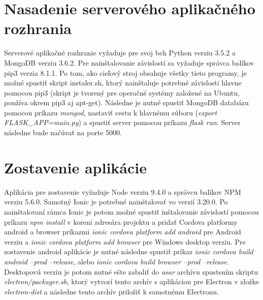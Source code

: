 \section{Nasadenie serverového aplikačného rozhrania}
Serverové aplikačné rozhranie vyžaduje pre svoj beh Python verziu 3.5.2 a MongoDB verziu 3.6.2. Pre nainštalovanie závislostí sa vyžaduje správca balíkov pip3 verzia 8.1.1. Po tom, ako cieľový stroj obsahuje všetky tieto programy, je možné spustiť skript instaler.sh, ktorý nainštaluje potrebné závislosti hlavne pomocou pip3 (skript je tvorený pre operačné systémy založené na Ubuntu, používa okrem pip3 aj apt-get). Následne je nutné spustiť MongoDB databázu pomocou príkazu \textit{mongod}, nastaviť cestu k hlavnému súboru (\textit{export FLASK\_APP=main.py}) a spustiť server pomocou príkazu \textit{flask run}. Server následne bude načúvať na porte 5000. 

\section{Zostavenie aplikácie}
Aplikácia pre zostavenie vyžaduje Node verziu 9.4.0 a správcu balíkov NPM verziu 5.6.0. Samotný Ionic je potrebné nainštalovať vo verzií 3.20.0. Po nainštalovaní rámca Ionic je potom možné spustiť inštalovanie závislostí pomocou príkazu \textit{npm install} v koreni adresára projektu a pridať Cordova platformy android a browser príkazmi \textit{ionic cordova platform add android} pre Android verziu a \textit{ionic cordova platform add browser} pre Windows desktop verziu. Pre zostavenie android aplikácie je nutné následne spustiť príkaz \textit{ionic cordova build android --prod --release}, alebo \textit{ionic cordova build browser --prod --release}. Desktopovú verziu je potom nutné ešte zabaliť do \textit{asar} archívu spustením skriptu \textit{electron/packager.sh}, ktorý vytvorí tento archív s aplikáciou pre Electron v zložke \textit{electron-dist} a následne tento archív priložiť k samotnému Electronu.

